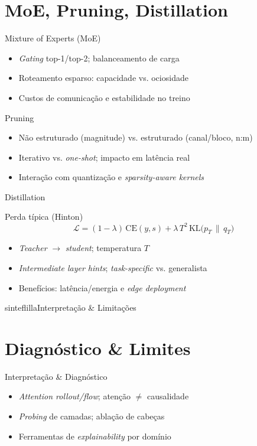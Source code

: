 \documentclass{beamer}
\begin{document}
\section{MoE, Pruning, Distillation}
\begin{frame}{Mixture of Experts (MoE)}
\begin{itemize}[<+->]
  \item \textit{Gating} top-1/top-2; balanceamento de carga
  \item Roteamento esparso: capacidade vs. ociosidade
  \item Custos de comunicação e estabilidade no treino
\end{itemize}
\end{frame}

\begin{frame}{Pruning}
\begin{itemize}[<+->]
  \item Não estruturado (magnitude) vs. estruturado (canal/bloco, n:m)
  \item Iterativo vs. \textit{one-shot}; impacto em latência real
  \item Interação com quantização e \textit{sparsity-aware kernels}
\end{itemize}
\end{frame}

\begin{frame}{Distillation}
\begin{block}{Perda típica (Hinton)}
\small
\[
\mathcal{L}=(1-\lambda)\,\mathrm{CE}(y,s)+\lambda\,T^2\,\mathrm{KL}\!\big(p_T \,\|\, q_T\big)
\]
\end{block}
\begin{itemize}[<+->]
  \item \textit{Teacher} $\rightarrow$ \textit{student}; temperatura $T$
  \item \textit{Intermediate layer hints}; \textit{task-specific} vs. generalista
  \item Benefícios: latência/energia e \textit{edge deployment}
\end{itemize}
\end{frame}

\begin{chapter}{sinteflilla}{Interpretação \& Limitações}\end{chapter}

\section{Diagnóstico \& Limites}
\begin{frame}{Interpretação \& Diagnóstico}
\begin{itemize}[<+->]
  \item \textit{Attention rollout/flow}; atenção $\neq$ causalidade
  \item \textit{Probing} de camadas; ablação de cabeças
  \item Ferramentas de \textit{explainability} por domínio
\end{itemize}
\end{frame}
\end{document}
